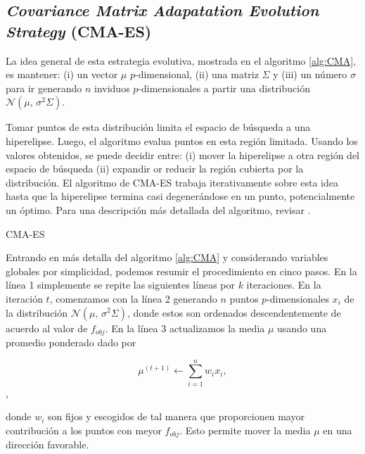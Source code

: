 \subsection{\emph{Covariance Matrix Adapatation Evolution Strategy} (CMA-ES)}

La idea general de esta estrategia evolutiva, mostrada en el algoritmo
\ref{alg:CMA}, es mantener:
(i) un vector $\mu$ $p$-dimensional,
(ii) una matriz $\Sigma$ y
(iii) un número $\sigma$ para ir generando $n$ inviduos $p$-dimensionales
a partir una distribución $\mathcal{N}(\mu,\,\sigma^{2} \Sigma)$.


Tomar puntos de esta distribución limita el espacio de búsqueda a una
hiperelipse.
Luego, el algoritmo evalua puntos en esta región limitada.
Usando los valores obtenidos, se puede decidir entre:
(i) mover la hiperelipse a otra región del espacio de búsqueda
(ii) expandir or reducir la región cubierta por la distribución.
El algoritmo de CMA-ES trabaja iterativamente sobre esta idea hasta que la
hiperelipse termina casi degenerándose en un punto, 
potencialmente un óptimo.
Para una descripción más detallada del algoritmo, revisar \citep{Mykel2019, Hansen2016}.

\begin{algorithm}
{}
\caption{CMA-ES}
\label{alg:CMA}
\end{algorithm}

Entrando en más detalla del algoritmo \ref{alg:CMA} y considerando variables
globales por simplicidad, podemos resumir el procedimiento en cinco pasos.
En la línea 1 simplemente se repite las siguientes líneas por $k$ iteraciones.
En la iteración $t$, comenzamos con la línea 2 generando $n$ puntos
$p$-dimensionales $x_i$ de la distribución $\mathcal{N}(\mu,\,\sigma^{2} \Sigma)$, 
donde estos son ordenados descendentemente de acuerdo
al valor de $f_{obj}$.
En la línea 3 actualizamos la media $\mu$ usando una promedio ponderado dado
por

\begin{equation}
    \mu^{(t + 1)} \gets \sum_{i=1}^{n} w_i x_i,
\label{cma-average}
\end{equation},

donde $w_i$ son fijos y escogidos de tal manera que proporcionen mayor
contribución a los puntos con meyor $f_{obj}$. Esto permite mover la media $\mu$
en una dirección favorable.


